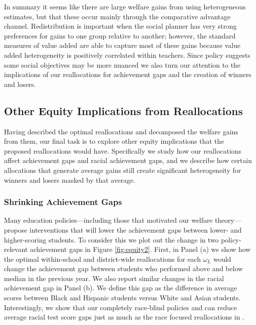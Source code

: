 \documentclass[12pt]{article}
\theoremstyle{definition}
\theoremstyle{definition}
\theoremstyle{definition}
\theoremstyle{definition}
\begin{document}
In summary it seems like there are large welfare gains from using heterogeneous estimates, but that these occur mainly through the comparative advantage channel. Redistribution is important when the social planner has very strong preferences for gains to one group relative to another; however, the standard measures of value added are able to capture most of these gains because value added heterogeneity is positively correlated within teachers. Since policy suggests some social objectives may be more nuanced we also turn our attention to the implications of our reallocations for achievement gaps and the creation of winners and losers.

\subsection{Other Equity Implications from Reallocations}

Having described the optimal reallocations and decomposed the welfare gains from them, our final task is to explore other equity implications that the proposed reallocations would have. Specifically we study how our reallocations affect achievement gaps and racial achievement gaps, and we describe how certain allocations that generate average gains still create significant heterogeneity for winners and losers masked by that average.

\subsubsection{Shrinking Achievement Gaps}

Many education policies---including those that motivated our welfare theory---propose interventions that will lower the achievement gaps between lower- and higher-scoring students. To consider this we plot out the change in two policy-relevant achievement gaps in Figure \ref{fig:equity2}. First, in Panel (a) we show how the optimal within-school and district-wide reallocations for each $\omega_L$ would change the achievement gap between students who performed above and below median in the previous year. We also report similar changes in the racial achievement gap in Panel (b). We define this gap as the difference in average scores between Black and Hispanic students versus White and Asian students. %
Interestingly, we show that our completely race-blind policies and can reduce average racial test score gaps just as much as the race focused reallocations in \citet{Delgado2020}.
\end{document}
